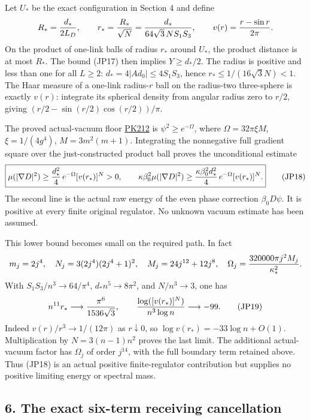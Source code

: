\documentclass[11pt]{article}
\begin{document}
Let \(U_*\) be the exact configuration in Section 4 and define
\[
 R_*={d_*\over2L_D},\qquad
 r_*={R_*\over\sqrt N}
      ={d_*\over64\sqrt3\,N S_1S_3},\qquad
 v(r)={r-\sin r\over2\pi}.
\]
On the product of one-link balls of radius \(r_*\) around \(U_*\),
the product distance is at most \(R_*\). The bound (JP17) then implies
\(Y\ge d_*/2\). The radius is positive and less than one for all
\(L\ge2\): \(d_*=4|Ad_0|\le4S_1S_3\), hence
\(r_*\le1/(16\sqrt3N)<1\).
The Haar measure of a one-link radius-\(r\) ball on the radius-two
three-sphere is exactly \(v(r)\): integrate its spherical density
from angular radius zero to \(r/2\), giving
\((r/2-\sin(r/2)\cos(r/2))/\pi\).

The proved actual-vacuum floor
\href{https://github.com/KokunoYumeto/yang-mills-interacting-workbench/blob/485b61423c1f4e1805deb453c1b6b342b27842b6/yang-mills/continuations/20260930-s6-ns-moment-map-bridge/PERIOD_COUPLING_AND_PHYSICAL_KERNELS.md#L4940}{PK212}
is \(\psi^2\ge e^{-\Omega}\), where
\(\Omega=32\pi\xi M\), \(\xi=1/(4g^4)\),
\(M=3m^2(m+1)\). Integrating the nonnegative full gradient square over
the just-constructed product ball proves the unconditional estimate
\[
\boxed{
 \mu(|\nabla D|^2)
 \ge {d_*^2\over4}\,e^{-\Omega}[v(r_*)]^N>0,\qquad
 \kappa\beta_0^2\mu(|\nabla D|^2)
 \ge {\kappa\beta_0^2d_*^2\over4}\,
                         e^{-\Omega}[v(r_*)]^N.}
\tag{JP18}
\]
The second line is the actual raw energy of the even phase correction
\(\beta_0D\psi\). It is positive at every finite original regulator.
No unknown vacuum estimate has been assumed.

This lower bound becomes small on the required path. In fact
\[
 m_j=2j^4,\quad N_j=3(2j^4)(2j^4+1)^2,\quad
 M_j=24j^{12}+12j^8,\quad
 \Omega_j={320000\pi j^2M_j\over\kappa_*^2}.
\]
With \(S_1S_3/n^3\to64/\pi^4\),
\(d_*n^5\to8\pi^2\), and \(N/n^3\to3\), one has
\[
 n^{11}r_*\longrightarrow{\pi^6\over1536\sqrt3},\qquad
 {\log([v(r_*)]^N)\over n^3\log n}\longrightarrow-99.
\tag{JP19}
\]
Indeed \(v(r)/r^3\to1/(12\pi)\) as \(r\downarrow0\), so
\(\log v(r_*)=-33\log n+O(1)\). Multiplication by
\(N=3(n-1)n^2\) proves the last limit. The additional actual-vacuum
factor has \(\Omega_j\) of order \(j^{14}\), with the full boundary
term retained above. Thus (JP18) is an actual positive finite-regulator
contribution but supplies no positive limiting energy or spectral mass.

\subsection*{6. The exact six-term receiving cancellation}
\end{document}
